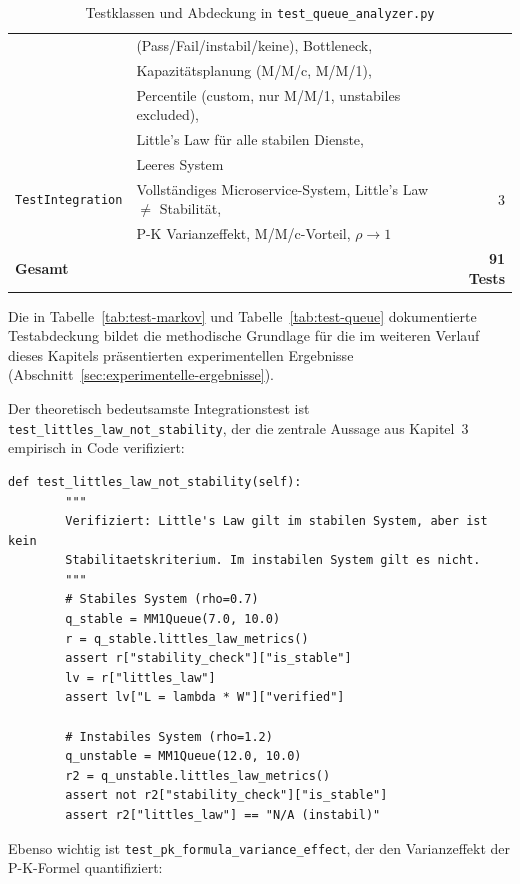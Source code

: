 ﻿\documentclass[a4paper,12pt]{report}
\theoremstyle{definition}
\begin{document}
\begin{table}
\begin{tabular}{@{}llr@{}}
		& (Pass/Fail/instabil/keine), Bottleneck, & \\
		& Kapazitätsplanung (M/M/c, M/M/1), & \\
		& Percentile (custom, nur M/M/1, unstabiles excluded), & \\
		& Little's Law für alle stabilen Dienste, & \\
		& Leeres System & \\
		\texttt{TestIntegration} & Vollständiges Microservice-System,
		Little's Law $\neq$ Stabilität, & 3 \\
		& P-K Varianzeffekt, M/M/c-Vorteil, $\rho \to 1$ & \\
		\midrule
		\textbf{Gesamt} & & \textbf{91 Tests} \\
		\bottomrule
	\end{tabular}
	\caption{Testklassen und Abdeckung in \texttt{test\_queue\_analyzer.py}}
\label{tab:test-queue}
	\label{tab:tests-queue}
\end{table}

Die in Tabelle~\ref{tab:test-markov} und Tabelle~\ref{tab:test-queue} dokumentierte Testabdeckung bildet die methodische Grundlage für die im weiteren Verlauf dieses Kapitels präsentierten experimentellen Ergebnisse (Abschnitt~\ref{sec:experimentelle-ergebnisse}).

Der theoretisch bedeutsamste Integrationstest ist
\texttt{test\_lit\-tles\_law\_not\_sta\-bility}, der die zentrale Aussage
aus Kapitel~3 empirisch in Code verifiziert:

\begin{lstlisting}[style=python, caption={Test: Little's Law ist kein Stabilitätskriterium (empirische Verifikation)}, label=lst:test-littles-not-stability]
def test_littles_law_not_stability(self):
        """
        Verifiziert: Little's Law gilt im stabilen System, aber ist kein
        Stabilitaetskriterium. Im instabilen System gilt es nicht.
        """
        # Stabiles System (rho=0.7)
        q_stable = MM1Queue(7.0, 10.0)
        r = q_stable.littles_law_metrics()
        assert r["stability_check"]["is_stable"]
        lv = r["littles_law"]
        assert lv["L = lambda * W"]["verified"]

        # Instabiles System (rho=1.2)
        q_unstable = MM1Queue(12.0, 10.0)
        r2 = q_unstable.littles_law_metrics()
        assert not r2["stability_check"]["is_stable"]
        assert r2["littles_law"] == "N/A (instabil)"
\end{lstlisting}

Ebenso wichtig ist \texttt{test\_pk\_formula\_variance\_effect}, der den
Varianzeffekt der P-K-Formel quantifiziert:
\end{document}
